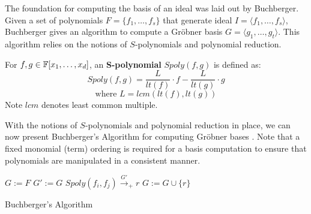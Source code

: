 The foundation for computing the \Grobner basis of an ideal was laid out 
by Buchberger\cite{buchberger_thesis}.
Given a set of polynomials $F=\{f_{1},\dots,f_{s}\}$ that generate ideal $I=
\langle f_{1},\dots,f_{s} \rangle$, 
Buchberger gives an algorithm to compute a Gr\"obner basis $G=\langle g_{1},
\dots,g_{t}\rangle$. This algorithm relies on the notions of $S$-polynomials 
and polynomial reduction.

\begin{Definition}
For $f, g \in {\mathbb{F}}[x_1,\dots,x_d]$, an {\bf S-polynomial} $Spoly(f,g)$ is 
defined as:
\begin{equation}
    Spoly(f,g)=\frac{L}{lt(f)}\cdot f - \frac{L}{lt(g)}\cdot g
    \label{eqn:spoly}
\end{equation}
\begin{equation}
\text{where }L = lcm\left(lt(f), lt(g)\right) \nonumber
\end{equation}
Note $lcm$ denotes least common multiple.
\end{Definition}

With the notions of $S$-polynomials and polynomial reduction in place,
we can now present Buchberger's Algorithm 
for computing Gr\"obner bases \cite{buchberger_thesis}. Note that a fixed 
monomial (term) ordering is required for a \Grobner basis 
computation to ensure that polynomials are manipulated in a consistent 
manner.

\begin{algorithm}[H]
\SetAlgoNoLine
\LinesNumbered
  $G:= F$\;
  {
  	$G' := G$\;
	{
		$Spoly(f_{i}, f_{j}) \stackrel{G'}{\textstyle\longrightarrow}_+r$ \;
		{
			$G:= G \cup \{r\}$ \;
		}
	}
   }
\caption {Buchberger's Algorithm}\label{alg:gb}
\end{algorithm}

